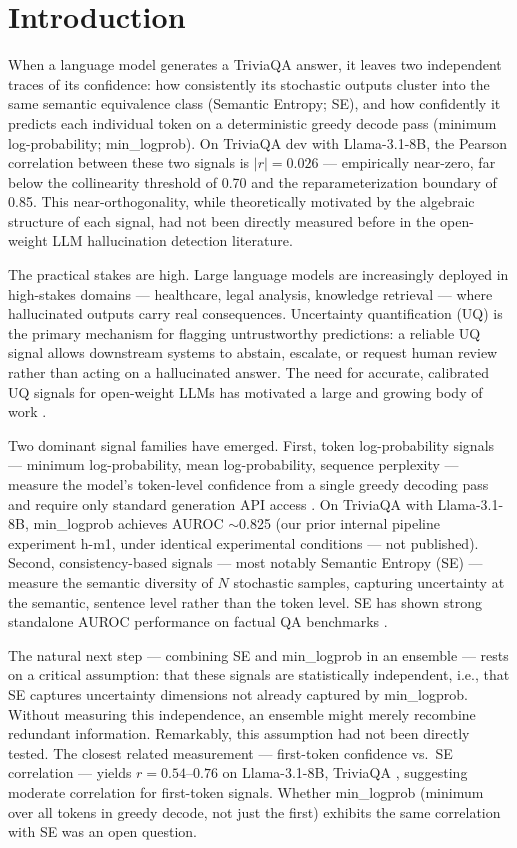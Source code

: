 \section{Introduction}

When a language model generates a TriviaQA answer, it leaves two independent traces of its confidence: how consistently its stochastic outputs cluster into the same semantic equivalence class (Semantic Entropy; SE), and how confidently it predicts each individual token on a deterministic greedy decode pass (minimum log-probability; min\_logprob). On TriviaQA dev with Llama-3.1-8B, the Pearson correlation between these two signals is $|r| = 0.026$ --- empirically near-zero, far below the collinearity threshold of 0.70 and the reparameterization boundary of 0.85. This near-orthogonality, while theoretically motivated by the algebraic structure of each signal, had not been directly measured before in the open-weight LLM hallucination detection literature.

The practical stakes are high. Large language models are increasingly deployed in high-stakes domains --- healthcare, legal analysis, knowledge retrieval --- where hallucinated outputs carry real consequences. Uncertainty quantification (UQ) is the primary mechanism for flagging untrustworthy predictions: a reliable UQ signal allows downstream systems to abstain, escalate, or request human review rather than acting on a hallucinated answer. The need for accurate, calibrated UQ signals for open-weight LLMs has motivated a large and growing body of work \citep{guo2017calibration, xiong2023llms, kang2025uncertainty}.

Two dominant signal families have emerged. First, token log-probability signals --- minimum log-probability, mean log-probability, sequence perplexity --- measure the model's token-level confidence from a single greedy decoding pass and require only standard generation API access \citep{malinin2021uncertainty}. On TriviaQA with Llama-3.1-8B, min\_logprob achieves AUROC $\sim$0.825 (our prior internal pipeline experiment h-m1, under identical experimental conditions --- not published). Second, consistency-based signals --- most notably Semantic Entropy (SE) \citep{kuhn2023semantic} --- measure the semantic diversity of $N$ stochastic samples, capturing uncertainty at the semantic, sentence level rather than the token level. SE has shown strong standalone AUROC performance on factual QA benchmarks \citep{kuhn2023semantic, bouchard2025uncertainty}.

The natural next step --- combining SE and min\_logprob in an ensemble --- rests on a critical assumption: that these signals are statistically independent, i.e., that SE captures uncertainty dimensions not already captured by min\_logprob. Without measuring this independence, an ensemble might merely recombine redundant information. Remarkably, this assumption had not been directly tested. The closest related measurement --- first-token confidence vs.\ SE correlation --- yields $r = 0.54$--$0.76$ on Llama-3.1-8B, TriviaQA \citep{gabriel2026first}, suggesting moderate correlation for first-token signals. Whether min\_logprob (minimum over all tokens in greedy decode, not just the first) exhibits the same correlation with SE was an open question.

